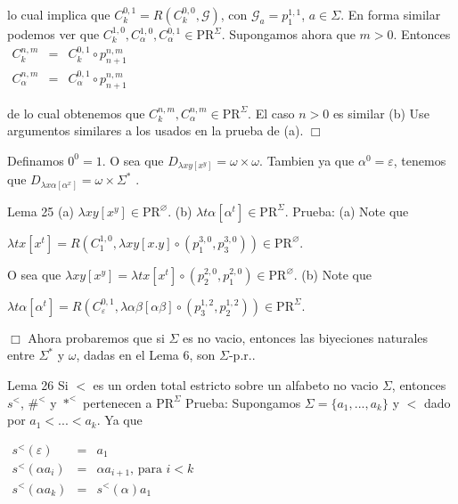 lo cual implica que \(C_{k}^{0,1}=R\left( C_{k}^{0,0},\mathcal{G}\right) \), con \(\mathcal{G}_{a}=p_{1}^{1,1}\), \(a\in \Sigma \). En forma similar podemos ver que \(C_{k}^{1,0},C_{\alpha }^{1,0},C_{\alpha }^{0,1}\in \mathrm{PR} ^{\Sigma }\). Supongamos ahora que \(m >0\). Entonces
\(\displaystyle \begin{array}{rcl} C_{k}^{n,m} & =& C_{k}^{0,1}\circ p_{n+1}^{n,m} \\ C_{\alpha }^{n,m} & =& C_{\alpha }^{0,1}\circ p_{n+1}^{n,m} \end{array} \)

de lo cual obtenemos que \(C_{k}^{n,m},C_{\alpha }^{n,m}\in \mathrm{PR} ^{\Sigma }\). El caso \(n >0\) es similar
(b) Use argumentos similares a los usados en la prueba de (a). \(\Box\)

Definamos \(0^{0}=1\). O sea que \(D_{\lambda xy\left[ x^{y}\right] }=\omega \times \omega .\) Tambien ya que \(\alpha ^{0}=\varepsilon \), tenemos que \( D_{\lambda x\alpha \left[ \alpha ^{x}\right] }=\omega \times \Sigma ^{\ast }\) .

Lema 25
(a) \(\lambda xy\left[ x^{y}\right] \in \mathrm{PR}^{\varnothing }\).
(b) \(\lambda t\alpha \left[ \alpha ^{t}\right] \in \mathrm{PR} ^{\Sigma }\).
Prueba: (a) Note que

\(\displaystyle \lambda tx\left[ x^{t}\right] =R\left( C_{1}^{1,0},\lambda xy\left[ x.y \right] \circ \left( p_{1}^{3,0},p_{3}^{3,0}\right) \right) \in \mathrm{PR} ^{\varnothing }. \)

O sea que \(\lambda xy\left[ x^{y}\right] =\lambda tx\left[ x^{t}\right] \circ \left( p_{2}^{2,0},p_{1}^{2,0}\right) \in \mathrm{PR}^{\varnothing }\).
(b) Note que

\(\displaystyle \lambda t\alpha \left[ \alpha ^{t}\right] =R\left( C_{\varepsilon }^{0,1},\lambda \alpha \beta \left[ \alpha \beta \right] \circ \left( p_{3}^{1,2},p_{2}^{1,2}\right) \right) \in \mathrm{PR}^{\Sigma }. \)

\(\Box\)
Ahora probaremos que si \(\Sigma \) es no vacio, entonces las biyeciones naturales entre \(\Sigma ^{\ast }\) y \(\omega \), dadas en el Lema 6, son \(\Sigma \)-p.r..

Lema 26 Si \(< \) es un orden total estricto sobre un alfabeto no vacio \( \Sigma \), entonces \(s^{< }\), \(\#^{< }\) y \(\ast ^{< }\) pertenecen a \(\mathrm{PR} ^{\Sigma }\)
Prueba: Supongamos \(\Sigma =\{a_{1},...,a_{k}\}\) y \(< \) dado por \(a_{1}< ...< a_{k}\). Ya que

\(\displaystyle \begin{array}{rcl} s^{< }(\varepsilon ) & =& a_{1} \\ s^{< }(\alpha a_{i}) & =& \alpha a_{i+1}\text{, para }i< k \\ s^{< }(\alpha a_{k}) & =& s^{< }(\alpha )a_{1} \end{array} \)

